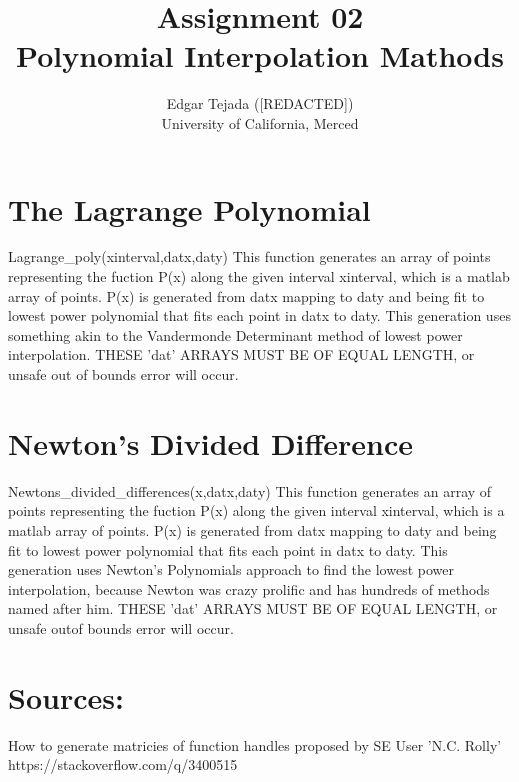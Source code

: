 \documentclass [12pt]{article}
\title{Assignment 02 \\\medskip Polynomial Interpolation Mathods}
\author{Edgar Tejada ([REDACTED])\\University of California, Merced}
\begin{document}
\maketitle

\newpage
\section{The Lagrange Polynomial}

\indent Lagrange_poly(xinterval,datx,daty)
\indent \indent This function generates an array of points representing the fuction P(x) along the given interval xinterval, which is a matlab array of points. P(x) is generated from datx mapping to daty and being fit to lowest power polynomial that fits each point in datx to daty. This generation uses something akin to the Vandermonde Determinant method of lowest power interpolation. THESE 'dat' ARRAYS MUST BE OF EQUAL LENGTH, or unsafe out of bounds error will occur.

\newpage
\section{Newton's Divided Difference}

\indent Newtons_divided_differences(x,datx,daty)
\indent \indent This function generates an array of points representing the fuction P(x) along the given interval xinterval, which is a matlab array of points. P(x) is generated from datx mapping to daty and being fit to lowest power polynomial that fits each point in datx to daty. This generation uses Newton's Polynomials approach  to find the  lowest power interpolation, because Newton was crazy prolific and has hundreds of methods named after him. THESE 'dat' ARRAYS MUST BE OF EQUAL LENGTH, or unsafe outof bounds error will occur.



\newpage
\section{Sources:}
How to generate matricies of function handles proposed by SE User 'N.C. Rolly'
\indent https://stackoverflow.com/q/3400515

\nocite{*} 
\printbibliography
\end{document}
